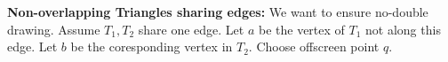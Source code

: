 \documentclass[letterpaper, 8pt]{extarticle}
\begin{document}
\begin{multicols*}{4}










    \textbf{Non-overlapping Triangles sharing edges:} We want to ensure no-double drawing.
    Assume $T_1, T_2$ share one edge. Let $a$ be the vertex of $T_1$ not along this edge. Let $b$ be the coresponding vertex in $T_2$.
    Choose offscreen point $q$.


\end{multicols*}
\end{document}
